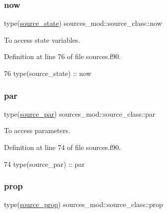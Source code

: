 \subsubsection{\texorpdfstring{now}{now}}
{\footnotesize\ttfamily type(\mbox{\hyperlink{structsources__mod_1_1source__state}{source\+\_\+state}}) sources\+\_\+mod\+::source\+\_\+class\+::now\hspace{0.3cm}{\ttfamily [private]}}



To access state variables. 



Definition at line 76 of file sources.\+f90.


\begin{DoxyCode}
76         \textcolor{keywordtype}{type}(source\_state) :: now
\end{DoxyCode}
\mbox{\label{structsources__mod_1_1source__class_a7dcca40df4b520fa207dbe93d7e49b2e}} 
\subsubsection{\texorpdfstring{par}{par}}
{\footnotesize\ttfamily type(\mbox{\hyperlink{structsources__mod_1_1source__par}{source\+\_\+par}}) sources\+\_\+mod\+::source\+\_\+class\+::par\hspace{0.3cm}{\ttfamily [private]}}



To access parameters. 



Definition at line 74 of file sources.\+f90.


\begin{DoxyCode}
74         \textcolor{keywordtype}{type}(source\_par)   :: par
\end{DoxyCode}
\mbox{\label{structsources__mod_1_1source__class_a5acc9ceca409e3c1ef2ed8112325a845}} 
\subsubsection{\texorpdfstring{prop}{prop}}
{\footnotesize\ttfamily type(\mbox{\hyperlink{structsources__mod_1_1source__prop}{source\+\_\+prop}}) sources\+\_\+mod\+::source\+\_\+class\+::prop\hspace{0.3cm}{\ttfamily [private]}}



